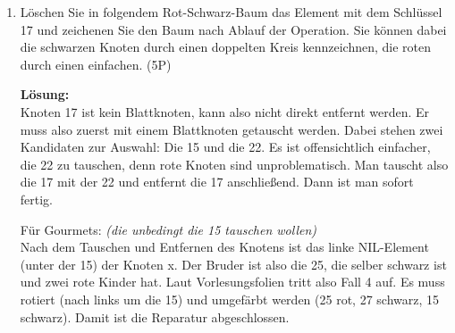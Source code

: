 \documentclass{scrartcl}
\newcommand{\nil}{N\newline I\newline L}
\begin{document}
\begin{enumerate}[(1)]
\item Löschen Sie in folgendem Rot-Schwarz-Baum das Element mit dem Schlüssel 17 und zeichenen Sie den Baum nach Ablauf der Operation. Sie können dabei die schwarzen Knoten durch einen doppelten Kreis kennzeichnen, die roten durch einen einfachen. (5P)\\

\begin{center}
\end{center}

\textbf{Lösung:} \\

Knoten 17 ist kein Blattknoten, kann also nicht direkt entfernt werden.
Er muss also zuerst mit einem Blattknoten getauscht werden. Dabei stehen zwei Kandidaten zur Auswahl:
Die 15 und die 22. Es ist offensichtlich einfacher, die 22 zu tauschen, denn rote Knoten sind unproblematisch.
Man tauscht also die 17 mit der 22 und entfernt die 17 anschließend. Dann ist man sofort fertig.
\pagebreak

Für Gourmets: \textit{(die unbedingt die 15 tauschen wollen)}\\
Nach dem Tauschen und Entfernen des Knotens ist das linke NIL-Element (unter der 15) der Knoten x. Der Bruder ist also die 25, die selber schwarz ist und zwei rote Kinder hat.
Laut Vorlesungsfolien tritt also Fall 4 auf. Es muss rotiert (nach links um die 15) und umgefärbt werden (25 rot, 27 schwarz, 15 schwarz). Damit ist die Reparatur abgeschlossen.
\end{enumerate}
\end{document}
